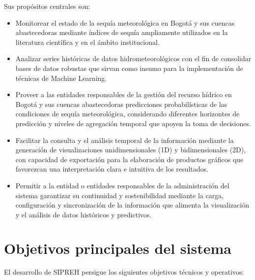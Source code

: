 Sus propósitos centrales son:

\begin{itemize}
    \item Monitorear el estado de la sequía meteorológica en Bogotá y sus cuencas abastecedoras mediante índices de sequía ampliamente utilizados en la literatura científica y en el ámbito institucional.
    \item Analizar series históricas de datos hidrometeorológicos con el fin de consolidar bases de datos robustas que sirvan como insumo para la implementación de técnicas de Machine Learning.
    \item Proveer a las entidades responsables de la gestión del recurso hídrico en Bogotá y sus cuencas abastecedoras predicciones probabilísticas de las condiciones de sequía meteorológica, considerando diferentes horizontes de predicción y niveles de agregación temporal que apoyen la toma de decisiones.
    \item Facilitar la consulta y el análisis temporal de la información mediante la generación de visualizaciones unidimensionales (1D) y bidimensionales (2D), con capacidad de exportación para la elaboración de productos gráficos que favorezcan una interpretación clara e intuitiva de los resultados.
    \item Permitir a la entidad o entidades responsables de la administración del sistema garantizar su continuidad y sostenibilidad mediante la carga, configuración y sincronización de la información que alimenta la visualización y el análisis de datos históricos y predictivos.
\end{itemize}

\section{Objetivos principales del sistema}
\label{sec:objetivos}

El desarrollo de SIPREH persigue los siguientes objetivos técnicos y operativos:

